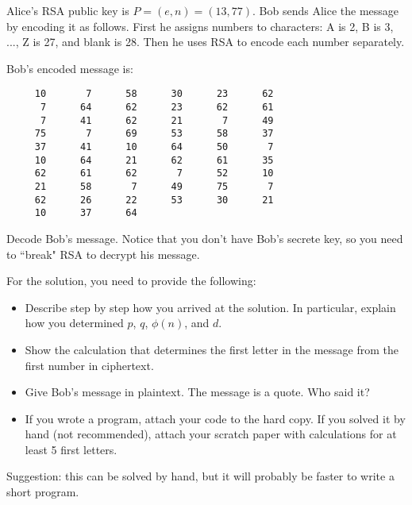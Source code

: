 \documentclass{article}
\begin{document}
\begin{problem}
Alice's RSA public key is $P = (e,n) = (13,77)$.
Bob sends Alice the message by encoding it as follows.
First he assigns numbers to characters:
A is 2, B is 3, ..., Z is 27, and blank is 28. Then he
uses RSA to encode each number separately. 

Bob's encoded message is:

\begin{verbatim}
     10       7      58      30      23      62 
      7      64      62      23      62      61 
      7      41      62      21       7      49 
     75       7      69      53      58      37 
     37      41      10      64      50       7 
     10      64      21      62      61      35 
     62      61      62       7      52      10 
     21      58       7      49      75       7 
     62      26      22      53      30      21 
     10      37      64
\end{verbatim}

Decode Bob's message.
Notice that you don't have Bob's secrete key, so you
need to ``break" RSA to decrypt his message.

\smallskip
For the solution, you need to provide the following:
%
\begin{itemize}
%
\item Describe step by step how you arrived at the solution.
	In particular, explain how you determined $p$, $q$, $\phi(n)$, and $d$.
%
\item Show the calculation that determines the first letter in the message from the first number in ciphertext.
%
\item Give Bob's message in plaintext. The message is a quote. Who said it?
%
\item If you wrote a program, attach your code to the hard copy.
	If you solved it by hand (not recommended), attach your scratch paper with calculations
	for at least 5 first letters.
%
\end{itemize}

Suggestion: this can be solved by hand, but it will probably
be faster to write a short program.
\end{problem}
\end{document}
